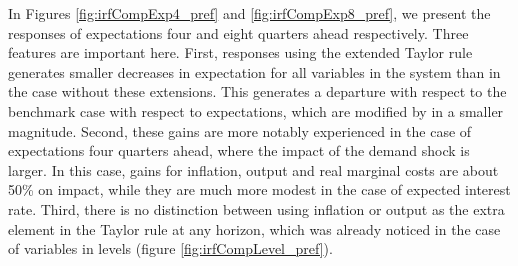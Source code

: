 \documentclass[11pt]{article}
\numberwithin{equation}{section}
\begin{document}
In Figures \ref{fig:irfCompExp4_pref} and \ref{fig:irfCompExp8_pref}, we present the responses of expectations four and eight quarters ahead respectively. Three features are important here. First, responses using the extended Taylor rule generates smaller decreases in expectation for all variables in the system than in the case without these extensions. This generates a departure with respect to the benchmark case with respect to expectations, which are modified by in a smaller magnitude. Second, these gains are more notably experienced in the case of expectations four quarters ahead, where the impact of the demand shock is larger. In this case, gains for inflation, output and real marginal costs are about 50\% on impact, while they are much more modest in the case of expected interest rate. Third, there is no distinction between using inflation or output as the extra element in the Taylor rule at any horizon, which was already noticed in the case of variables in levels (figure \ref{fig:irfCompLevel_pref}).
\end{document}
